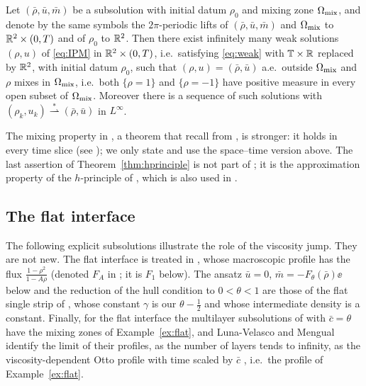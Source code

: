 \begin{theorem}\label{thm:hprinciple}
Let $(\bar\rho,\bar u,\bar m)$ be a subsolution with initial datum $\rho_0$ and mixing zone $\Omega_{\rm mix}$, and denote by the same symbols the $2\pi$-periodic lifts of $(\bar\rho,\bar u,\bar m)$
and $\Omega_{\rm mix}$ to $\mathbb{R}^2\times(0,T)$ and of $\rho_0$ to $\mathbb{R}^2$. Then there exist infinitely many weak solutions $(\rho,u)$ of \eqref{eq:IPM} in $\mathbb{R}^2\times(0,T)$, i.e.\ satisfying
\eqref{eq:weak} with $\mathbb{T}\times\mathbb{R}$ replaced by $\mathbb{R}^2$, with initial datum $\rho_0$, such that $(\rho,u)=(\bar\rho,\bar u)$ a.e.\ outside $\Omega_{\rm mix}$ and $\rho$ mixes in $\Omega_{\rm mix}$,
i.e.\ both $\{\rho=1\}$ and $\{\rho=-1\}$ have positive measure in every open subset of $\Omega_{\rm mix}$. Moreover there is a sequence of such solutions with
$(\rho_k,u_k)\overset{*}{\rightharpoonup}(\bar\rho,\bar u)$ in $L^\infty$.
\end{theorem}

The mixing property in \cite[Thm.~2.3]{LM26}, a theorem that \cite{LM26} recall from \cite{Sze12,Men22}, is stronger: it holds in every time slice \cite[Def.~2.2]{LM26} (see \cite{CCF21,CFM19}); we only state and use the space--time
version above. The last assertion of Theorem~\ref{thm:hprinciple} is not part of \cite[Thm.~2.3]{LM26}; it is the approximation property of the $h$-principle of \cite[Thm.~2.1]{Men22}, which is
also used in \cite[App.~A.1.2]{LM26}.

\subsection{The flat interface}
The following explicit subsolutions illustrate the role of the viscosity jump. They are not new. The flat interface is treated in \cite{Men22}, whose macroscopic profile
\cite[Sec.~2]{Men22} has the flux $\frac{1-\rho^2}{1-A\rho}$ (denoted $F_A$ in \cite[Sec.~7.5]{LM26}; it is $F_1$ below). The ansatz $\bar u=0$, $\bar m=-F_\theta(\bar\rho)\ee$ below and the
reduction of the hull condition to $0<\theta<1$ are those of the flat single strip of \cite[Sec.~3.2]{LM26}, whose constant $\gamma$ is our $\theta-\frac12$ and whose intermediate density is
a constant.
Finally, for the flat interface the multilayer subsolutions of \cite[Sec.~7.5]{LM26} with $\bar c=\theta$ have the mixing zones of Example~\ref{ex:flat}, and Luna-Velasco and Mengual
identify the limit of their profiles, as the number of layers tends to infinity, as the viscosity-dependent Otto profile with time scaled by $\bar c$ \cite[Sec.~7.5]{LM26}, i.e.\ the profile of
Example~\ref{ex:flat}.

